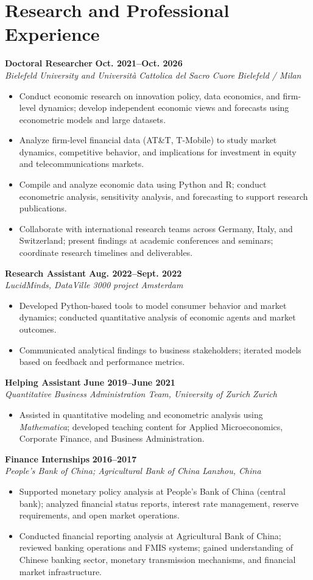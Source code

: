 \documentclass[a4paper,11pt]{article}
\newcommand{\role}[4]{%
  \textbf{#1} \hfill \textbf{#2}\\
  \textit{#3} \hfill \textit{#4}\par
}
\begin{document}
\section{Research and Professional Experience}
\role{Doctoral Researcher}{Oct. 2021--Oct. 2026}{Bielefeld University and Universit\`a Cattolica del Sacro Cuore}{Bielefeld / Milan}
\begin{itemize}
  \item Conduct economic research on innovation policy, data economics, and firm-level dynamics; develop independent economic views and forecasts using econometric models and large datasets.
  \item Analyze firm-level financial data (AT\&T, T-Mobile) to study market dynamics, competitive behavior, and implications for investment in equity and telecommunications markets.
  \item Compile and analyze economic data using Python and R; conduct econometric analysis, sensitivity analysis, and forecasting to support research publications.
  \item Collaborate with international research teams across Germany, Italy, and Switzerland; present findings at academic conferences and seminars; coordinate research timelines and deliverables.
\end{itemize}

\role{Research Assistant}{Aug. 2022--Sept. 2022}{LucidMinds, DataVille 3000 project}{Amsterdam}
\begin{itemize}
  \item Developed Python-based tools to model consumer behavior and market dynamics; conducted quantitative analysis of economic agents and market outcomes.
  \item Communicated analytical findings to business stakeholders; iterated models based on feedback and performance metrics.
\end{itemize}

\role{Helping Assistant}{June 2019--June 2021}{Quantitative Business Administration Team, University of Zurich}{Zurich}
\begin{itemize}
  \item Assisted in quantitative modeling and econometric analysis using \textit{Mathematica}; developed teaching content for Applied Microeconomics, Corporate Finance, and Business Administration.
\end{itemize}

\role{Finance Internships}{2016--2017}{People's Bank of China; Agricultural Bank of China}{Lanzhou, China}
\begin{itemize}
  \item Supported monetary policy analysis at People's Bank of China (central bank); analyzed financial status reports, interest rate management, reserve requirements, and open market operations.
  \item Conducted financial reporting analysis at Agricultural Bank of China; reviewed banking operations and FMIS systems; gained understanding of Chinese banking sector, monetary transmission mechanisms, and financial market infrastructure.
\end{itemize}
\end{document}
